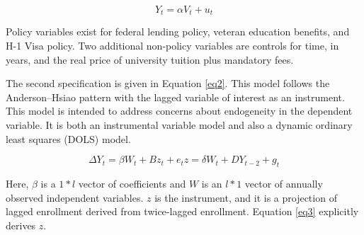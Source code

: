 \documentclass[review]{elsarticle}
\begin{document}
\begin{equation}
    Y_t = \alpha{V_{t}}+u_t
    \label{eq1}
\end{equation}

Policy variables exist for federal lending policy, veteran education benefits, and H-1 Visa policy.
Two additional non-policy variables are controls for time, in years,
and the real price of university tuition plus mandatory fees.

The second specification is given in Equation \ref{eq2}.
This model follows the Anderson–Hsiao pattern\cite{anderson1981estimation} with the lagged variable of interest as an instrument.
This model is intended to address concerns about endogeneity in the dependent variable.
It is both an instrumental variable model and also a dynamic ordinary least squares (DOLS) model.

\begin{subequations}
    \begin{equation}
        \Delta{Y_t} = \beta{W_{t}}+B{z_t}+e_t
        \label{eq2}
    \end{equation}
    \begin{equation}
        z = \delta{W_{t}}+D{Y_{t-2}}+g_t
        \label{eq3}
    \end{equation}
\end{subequations}

Here, $\beta$ is a $1*l$ vector of coefficients and $W$ is an $l*1$ vector of annually observed independent variables.
$z$ is the instrument, and it is a projection of lagged enrollment derived from twice-lagged enrollment.
Equation \ref{eq3} explicitly derives $z$.
\end{document}
